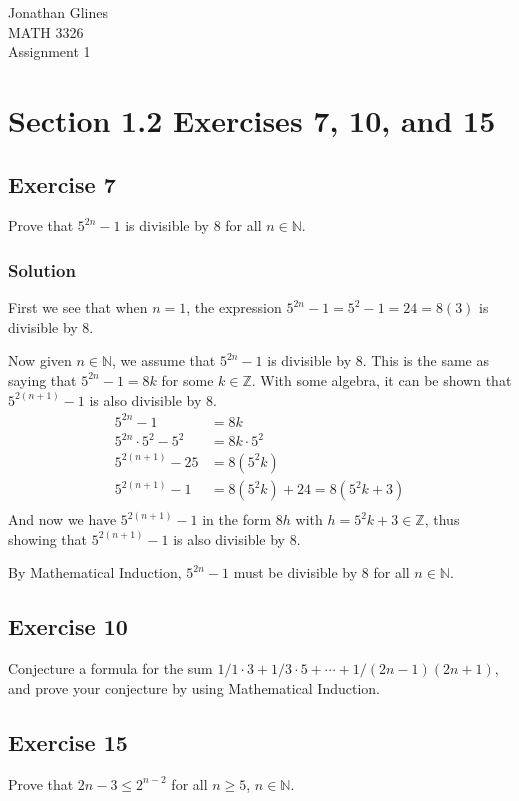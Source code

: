 \documentclass[12pt]{article}
\begin{document}
\begin{flushright}
{\Large
Jonathan Glines \\
MATH 3326 \\
Assignment 1 \\
}
\end{flushright}
\section*{Section 1.2 Exercises 7, 10, and 15}
\subsection*{Exercise 7}
Prove that $5^{2n} - 1$ is divisible by 8 for all $n \in \mathbb{N}$.
\subsubsection*{Solution}
First we see that when $n = 1$, the expression $5^{2n} - 1 = 5^2 - 1 = 24 = 8(3)$ is divisible by 8.

Now given $n \in \mathbb{N}$, we assume that $5^{2n} - 1$ is divisible by 8. This is the same as saying that $5^{2n} - 1 = 8k$ for some $k \in \mathbb{Z}$. With some algebra, it can be shown that $5^{2\left(n + 1\right)} - 1$ is also divisible by 8.
\begin{align*}
5^{2n} - 1 &= 8k \\
5^{2n} \cdot 5^2 - 5^2 &= 8k \cdot 5^2 \\
5^{2\left(n + 1\right)} - 25 &= 8\left(5^2 k\right) \\
5^{2\left(n + 1\right)} - 1 &= 8\left(5^2 k\right) + 24 = 8\left(5^2 k + 3\right) \\
\end{align*}
And now we have $5^{2\left(n + 1\right)} - 1$ in the form $8h$ with $h = 5^2 k + 3 \in \mathbb{Z}$, thus showing that $5^{2\left(n + 1\right)} - 1$ is also divisible by 8.

By Mathematical Induction, $5^{2n} - 1$ must be divisible by 8 for all $n \in \mathbb{N}$.

\subsection*{Exercise 10}
Conjecture a formula for the sum $1/1\cdot 3 + 1/3 \cdot 5 + \cdots + 1 / \left(2n - 1\right)\left(2n+1\right)$, and prove your conjecture by using Mathematical Induction.

\subsection*{Exercise 15}
Prove that $2n - 3 \leq 2^{n-2}$ for all $n \geq 5$, $n \in \mathbb{N}$.
\end{document}
